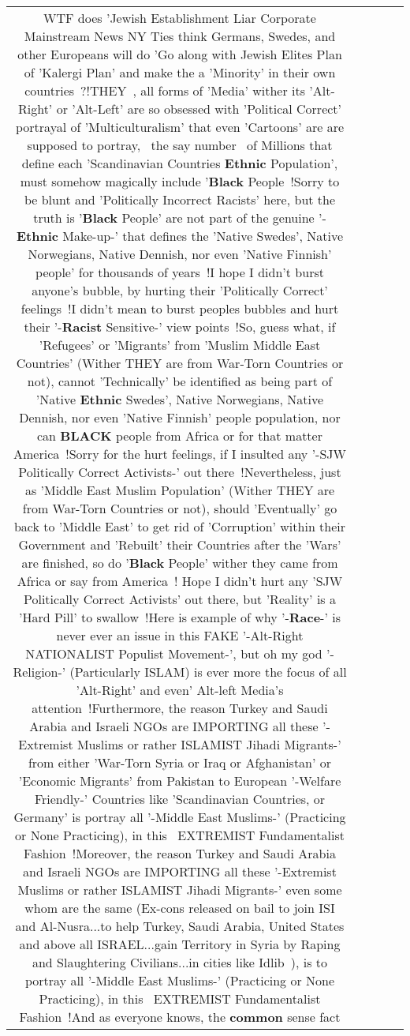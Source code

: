 \documentclass[11pt]{article}
\newlength\mylength
\begin{document}
\begin{center}
\begin{longtable}{|C{.65\mylength}|C{.30\mylength}|C{.12\mylength}|C{.12\mylength}|C{.12\mylength}|}
  \small WTF does 'Jewish Establishment Liar Corporate Mainstream News NY Ties think Germans, Swedes, and other Europeans will do 'Go along with Jewish Elites Plan of 'Kalergi Plan' and make the a 'Minority' in their own countries~?!THEY~, all forms of 'Media' wither its 'Alt-Right' or 'Alt-Left' are so obsessed with 'Political Correct' portrayal of 'Multiculturalism' that even 'Cartoons' are are supposed to portray, ~the say number~ of Millions that define each 'Scandinavian Countries \textbf{Ethnic} Population', must somehow magically include '\textbf{Black} People~!Sorry to be blunt and 'Politically Incorrect Racists' here, but the truth is '\textbf{Black} People' are not part of the genuine '-\textbf{Ethnic} Make-up-' that defines the 'Native Swedes', Native Norwegians, Native Dennish, nor even 'Native Finnish' people' for thousands of years~!I hope I didn't burst anyone's bubble, by hurting their 'Politically Correct' feelings~!I didn't mean to burst peoples bubbles and hurt their '-\textbf{Racist} Sensitive-' view points~!So, guess what, if 'Refugees' or 'Migrants' from 'Muslim Middle East Countries' (Wither THEY are from War-Torn Countries or not), cannot 'Technically' be identified as being part of 'Native \textbf{Ethnic} Swedes', Native Norwegians, Native Dennish, nor even 'Native Finnish' people population, nor can \textbf{BLACK} people from Africa or for that matter America~!Sorry for the hurt feelings, if I insulted any '-SJW Politically Correct Activists-' out there~!Nevertheless, just as 'Middle East Muslim Population' (Wither THEY are from War-Torn Countries or not), should 'Eventually' go back to 'Middle East' to get rid of 'Corruption' within their Government and 'Rebuilt' their Countries after the 'Wars' are finished, so do '\textbf{Black} People' wither they came from Africa or say from America~! Hope I didn't hurt any  'SJW Politically Correct Activists' out there, but 'Reality' is a 'Hard Pill' to swallow~!Here is example of why '-\textbf{Race}-' is never ever an issue in this FAKE '-Alt-Right NATIONALIST Populist Movement-', but oh my god '-Religion-' (Particularly ISLAM) is ever more the focus of all 'Alt-Right' and even' Alt-left Media's attention~!Furthermore, the reason Turkey and Saudi Arabia and Israeli NGOs are IMPORTING all these '-Extremist Muslims or rather ISLAMIST Jihadi Migrants-' from either 'War-Torn Syria or Iraq or Afghanistan' or 'Economic Migrants' from Pakistan to European '-Welfare Friendly-' Countries like 'Scandinavian Countries, or Germany' is portray all '-Middle East Muslims-' (Practicing or None Practicing), in this ~EXTREMIST Fundamentalist Fashion~!Moreover, the reason Turkey and Saudi Arabia and Israeli NGOs are IMPORTING all these '-Extremist Muslims or rather ISLAMIST Jihadi Migrants-' even some whom are the same (Ex-cons released on bail to join ISI and Al-Nusra...to help Turkey, Saudi Arabia, United States and above all ISRAEL...gain Territory in Syria by Raping and Slaughtering Civilians...in cities like Idlib~), is to portray all '-Middle East Muslims-' (Practicing or None Practicing), in this ~EXTREMIST Fundamentalist Fashion~!And as everyone knows, the \textbf{common} sense fact 
\end{longtable}
\end{center}
\end{document}
